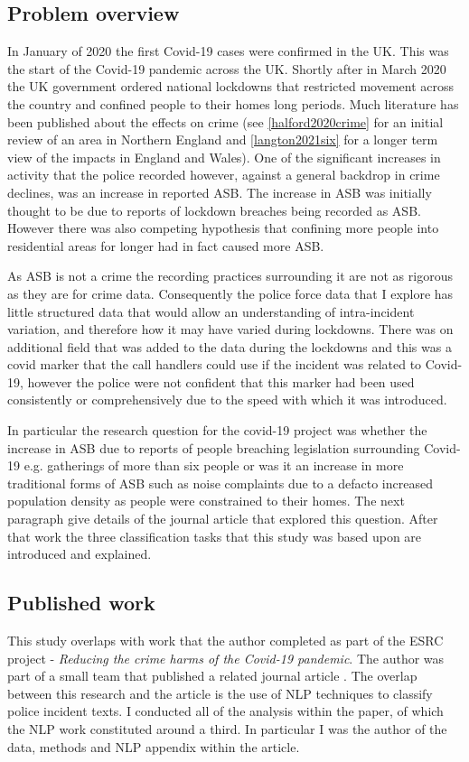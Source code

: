 \subsection{Problem overview} In January of 2020 the first Covid-19 cases were confirmed in the UK. This was the start of the Covid-19 pandemic across the UK. Shortly after in March 2020 the UK government ordered national lockdowns that restricted movement across the country and confined people to their homes long periods. Much literature has been published about the effects on crime (see \ref{halford2020crime} for an initial review of an area in Northern England and \ref{langton2021six} for a longer term view of the impacts in England and Wales). One of the significant increases in activity that the police recorded however, against a general backdrop in crime declines, was an increase in reported ASB. The increase in ASB was initially thought to be due to reports of lockdown breaches being recorded as ASB. However there was also competing hypothesis that confining more people into residential areas for longer had in fact caused more ASB. 

As ASB is not a crime the recording practices surrounding it are not as rigorous as they are for crime data. Consequently the police force data that I explore has little structured data that would allow an understanding of intra-incident variation, and therefore how it may have varied during lockdowns. There was on additional field that was added to the data during the lockdowns and this was a covid marker that the call handlers could use if the incident was related to Covid-19, however the police were not confident that this marker had been used consistently or comprehensively due to the speed with which it was introduced. 
 
In particular the research question for the covid-19 project was whether the increase in ASB due to reports of people breaching legislation surrounding Covid-19 e.g. gatherings of more than six people or was it an increase in more traditional forms of ASB such as noise complaints due to a defacto increased population density as people were constrained to their homes. The next paragraph give details of the journal article that explored this question. After that work the three classification tasks that this study was based upon are introduced and explained. 

\subsection{Published work} This study overlaps with work that the author completed as part of the ESRC project - \emph{Reducing the crime harms of the Covid-19 pandemic}. The author was part of a small team that published a related journal article \textcite{halford_dixon_farrell_2022}. The overlap between this research and the article is the use of NLP techniques to classify police incident texts. I conducted all of the analysis within the paper, of which the NLP work constituted around a third. In particular I was the author of the data, methods and NLP appendix within the article.

